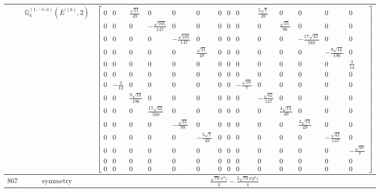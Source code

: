 \documentclass[fleqn,8pt,landscape]{jsarticle}
\begin{document}
\begin{longtable}{ccc}
$  $ & $ \mathbb{Q}_{4}^{(1,-1;a)}(E^{\prime(b)},2) $ & $ \begin{bmatrix} 0 & 0 & \frac{\sqrt{21}}{49} & 0 & 0 & 0 & 0 & 0 & 0 & \frac{5 \sqrt{7}}{49} & 0 & 0 & 0 & 0 \\ 0 & 0 & 0 & - \frac{\sqrt{105}}{147} & 0 & 0 & 0 & 0 & 0 & 0 & \frac{\sqrt{35}}{98} & 0 & 0 & 0 \\ 0 & 0 & 0 & 0 & - \frac{\sqrt{105}}{147} & 0 & 0 & 0 & 0 & 0 & 0 & - \frac{17 \sqrt{42}}{588} & 0 & 0 \\ 0 & 0 & 0 & 0 & 0 & \frac{\sqrt{21}}{49} & 0 & 0 & 0 & 0 & 0 & 0 & - \frac{9 \sqrt{14}}{196} & 0 \\ 0 & 0 & 0 & 0 & 0 & 0 & 0 & 0 & 0 & 0 & 0 & 0 & 0 & \frac{3}{14} \\ 0 & 0 & 0 & 0 & 0 & 0 & 0 & 0 & 0 & 0 & 0 & 0 & 0 & 0 \\ 0 & - \frac{3}{14} & 0 & 0 & 0 & 0 & 0 & 0 & - \frac{\sqrt{10}}{7} & 0 & 0 & 0 & 0 & 0 \\ 0 & 0 & \frac{9 \sqrt{14}}{196} & 0 & 0 & 0 & 0 & 0 & 0 & - \frac{\sqrt{42}}{147} & 0 & 0 & 0 & 0 \\ 0 & 0 & 0 & \frac{17 \sqrt{42}}{588} & 0 & 0 & 0 & 0 & 0 & 0 & \frac{4 \sqrt{14}}{49} & 0 & 0 & 0 \\ 0 & 0 & 0 & 0 & - \frac{\sqrt{35}}{98} & 0 & 0 & 0 & 0 & 0 & 0 & \frac{4 \sqrt{14}}{49} & 0 & 0 \\ 0 & 0 & 0 & 0 & 0 & - \frac{5 \sqrt{7}}{49} & 0 & 0 & 0 & 0 & 0 & 0 & - \frac{\sqrt{42}}{147} & 0 \\ 0 & 0 & 0 & 0 & 0 & 0 & 0 & 0 & 0 & 0 & 0 & 0 & 0 & - \frac{\sqrt{10}}{7} \\ 0 & 0 & 0 & 0 & 0 & 0 & 0 & 0 & 0 & 0 & 0 & 0 & 0 & 0 \\ 0 & 0 & 0 & 0 & 0 & 0 & 0 & 0 & 0 & 0 & 0 & 0 & 0 & 0 \end{bmatrix} $ \\ \hline
$ 867 $ & $ \text{symmetry} $ & $ \frac{\sqrt{70} x^{3} z}{4} - \frac{3 \sqrt{70} x y^{2} z}{4} $ \\

\end{longtable}
\end{document}
